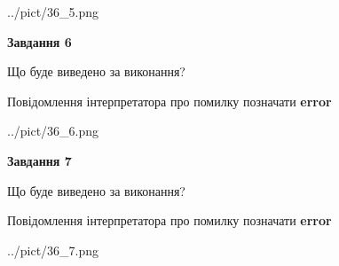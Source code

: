\documentclass[10pt, ukrainian]{article}
\begin{document}
{\begin {large}
\begin{center}
	{../pict/36_5.png}
\end{center}
\newpage

{\begin {center}\textbf{Завдання 6}\end {center}}\par
Що буде виведено за виконання? \par
Повідомлення інтерпретатора про помилку позначати \textbf{error}

\begin{center}
	{../pict/36_6.png}
\end{center}
\newpage

{\begin {center}\textbf{Завдання 7}\end {center}}\par
Що буде виведено за виконання? \par
Повідомлення інтерпретатора про помилку позначати \textbf{error}

\begin{center}
	{../pict/36_7.png}
\end{center}
\newpage

\end {large}}
\end{document}
